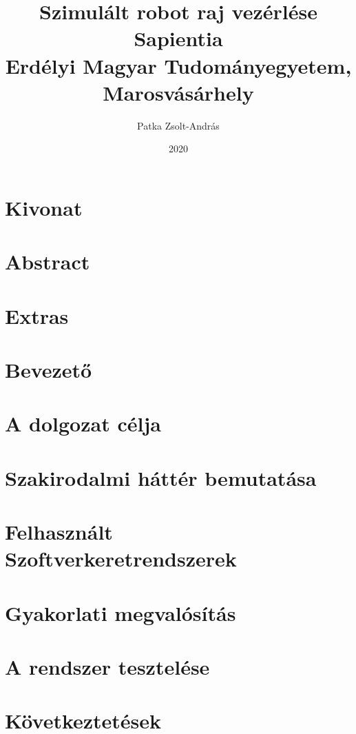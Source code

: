 \documentclass[12pt, twoside]{report}
\title{
	{Szimulált robot raj vezérlése}\\
	{\large Sapientia\\
	Erdélyi Magyar Tudományegyetem, Marosvásárhely}
}
\author{Patka Zsolt-András}
\date{2020}
\begin{document}
\maketitle
{}
\clearpage\mbox{}\clearpage

\chapter*{Kivonat}


\chapter*{Abstract}


\chapter*{Extras}



\tableofcontents


\chapter{Bevezető}


\chapter{A dolgozat célja}


\chapter{Szakirodalmi háttér bemutatása}


\chapter{Felhasznált Szoftverkeretrendszerek}


\chapter{Gyakorlati megvalósítás}


\chapter{A rendszer tesztelése}


\chapter{Következtetések}






\end{document}
